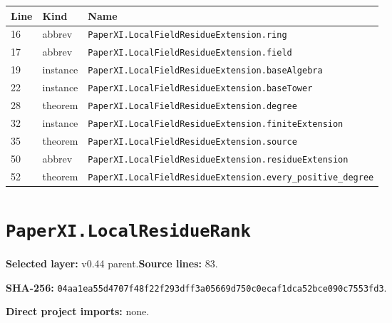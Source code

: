 \documentclass[10pt,oneside]{book}
\begin{document}
\begin{longtable}{@{}p{}p{}p{}@{}}\toprule Line&Kind&Name\\\midrule\endhead

16&abbrev&\nolinkurl{PaperXI.LocalFieldResidueExtension.ring}\\

17&abbrev&\nolinkurl{PaperXI.LocalFieldResidueExtension.field}\\

19&instance&\nolinkurl{PaperXI.LocalFieldResidueExtension.baseAlgebra}\\

22&instance&\nolinkurl{PaperXI.LocalFieldResidueExtension.baseTower}\\

28&theorem&\nolinkurl{PaperXI.LocalFieldResidueExtension.degree}\\

32&instance&\nolinkurl{PaperXI.LocalFieldResidueExtension.finiteExtension}\\

35&theorem&\nolinkurl{PaperXI.LocalFieldResidueExtension.source}\\

50&abbrev&\nolinkurl{PaperXI.LocalFieldResidueExtension.residueExtension}\\

52&theorem&\nolinkurl{PaperXI.LocalFieldResidueExtension.every_positive_degree}\\

\bottomrule\end{longtable}

\section{\texorpdfstring{\nolinkurl{PaperXI.LocalResidueRank}}{PaperXI.LocalResidueRank}}\label{module:PaperXI.LocalResidueRank}

\textbf{Selected layer:} v0.44 parent.\quad\textbf{Source lines:} 83.\par\textbf{SHA-256:} {\scriptsize\nolinkurl{04aa1ea55d4707f48f22f293dff3a05669d750c0ecaf1dca52bce090c7553fd3}}.


\textbf{Direct project imports:} none.
\end{document}
